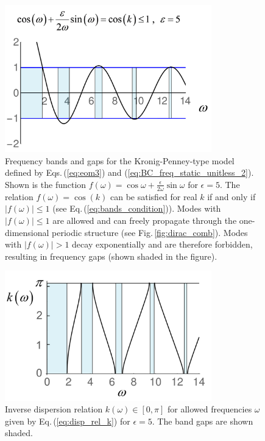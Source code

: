 \begin{figure}
    \includegraphics[width=0.8\textwidth, keepaspectratio]{figures/system/cosk.png}
    \caption{Frequency bands and gaps for the Kronig-Penney-type model defined by 
    Eqs.\,(\ref{eq:eom3}) and (\ref{eq:BC_freq_static_unitless_2}).
    Shown is the function
    $f(\omega) = \cos{\omega} + \frac{\epsilon}{2 \omega} \sin{\omega}$ for $\epsilon=5$. 
    The relation $f(\omega) = \cos(k)$ can be satisfied for real $k$ if and only if 
    $|f(\omega)| \le 1$ (see Eq.\,(\ref{eq:bands_condition})). 
    Modes with $|f(\omega)| \le 1$
    are allowed and can freely propagate through the one-dimensional periodic structure
    (see Fig.\,\ref{fig:dirac_comb}).
    Modes with $|f(\omega)| > 1$ decay exponentially and are therefore forbidden, 
    resulting in frequency gaps (shown shaded in the figure).}
    \label{fig:band_condition}
\end{figure}

\begin{figure}
    \includegraphics[width=0.8\textwidth, keepaspectratio]{figures/system/komega.png}
    \caption{Inverse dispersion relation $k(\omega) \in [0,\pi]$ 
    for allowed frequencies $\omega$ given by Eq.\,(\ref{eq:disp_rel_k}) for $\epsilon=5$. 
    The band gaps are shown shaded.}  
    \label{fig:komega}
\end{figure}

